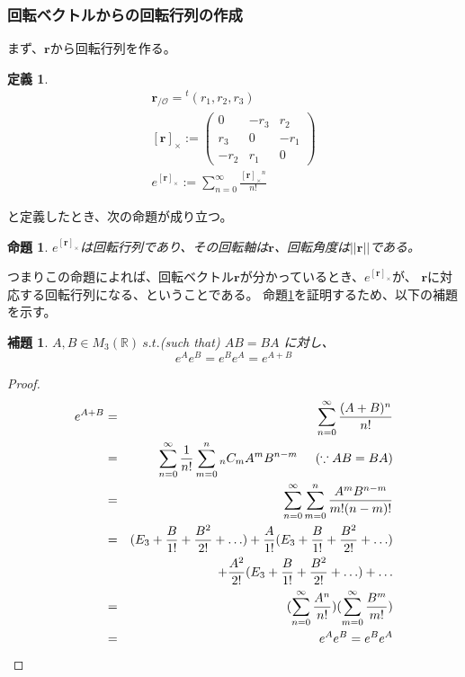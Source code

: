 \documentclass[10pt]{jarticle}
\newtheorem{Def}{定義}[section]
\newtheorem{Prp}{命題}[section]
\newtheorem{Lem}{補題}[section]
\begin{document}
\subsubsection{回転ベクトルからの回転行列の作成}
まず、$\boldsymbol{r}$から回転行列を作る。
\begin{Def}
    \begin{eqnarray}
        \boldsymbol{r}_{/\mathcal{O}} = {}^t(r_1,r_2,r_3)\\
        {[\boldsymbol{r}]_{\times}} := 
        \left(
          \begin{array}{ccc}
              0 &-r_3 &r_2  \\
              r_3 & 0& -r_1 \\
              -r_2 & r_1& 0
          \end{array}
        \right) \\
        e^{[\boldsymbol{r}]_{\times}}:=\sum_{n=0}^{\infty}\frac{[\boldsymbol{r}]_{\times}{}^n}{n!} \label{eq:defe^r}
    \end{eqnarray}
\end{Def}

と定義したとき、次の命題が成り立つ。

\begin{Prp}\label{thm:rotvec}
    $e^{[\boldsymbol{r}]_{\times}}$は回転行列であり、その回転軸は$\boldsymbol{r}$、回転角度は$||\boldsymbol{r}||$である。
\end{Prp}


つまりこの命題によれば、回転ベクトル$\boldsymbol{r}$が分かっているとき、$e^{[\boldsymbol{r}]_{\times}}$が、
$\boldsymbol{r}$に対応する回転行列になる、ということである。
命題\ref{thm:rotvec}を証明するため、以下の補題を示す。

\begin{Lem} \label{lem:powerOfE}
    $A,B \in M_3(\mathbb{R}) \ s.t.$(such that)  $AB=BA$
    に対し、
    \begin{equation}
        e^A e^B = e^B e^A = e^{A+B}
    \end{equation}
\end{Lem}

\begin{proof}
    \begin{eqnarray}
        e^{A+B}&=&\sum_{n=0}^{\infty} \frac{(A+B)^n}{n!}\nonumber\\
        &=&\sum_{n=0}^{\infty}\frac{1}{n!} \sum_{m=0}^n {}_nC_m A^m B^{n-m} \hspace{5mm}(\because AB=BA) \nonumber\\
        &=&\sum_{n=0}^{\infty}\sum_{m=0}^n \frac{A^m B^{n-m}}{m! (n-m)!} \nonumber\\
        &=&(E_3+\frac{B}{1!}+\frac{B^2}{2!}+\hdots)+\frac{A}{1!}(E_3+\frac{B}{1!}+\frac{B^2}{2!}+\hdots) \nonumber\\
        &&+\frac{A^2}{2!}(E_3+\frac{B}{1!}+\frac{B^2}{2!}+\hdots)+\hdots \nonumber\\
        &=&(\sum_{n=0}^{\infty} \frac{A^n}{n!}) (\sum_{m=0}^{\infty} \frac{B^m}{m!}) \nonumber\\
        &=&e^A e^B = e^B e^A \nonumber
    \end{eqnarray}
\end{proof}
\end{document}
